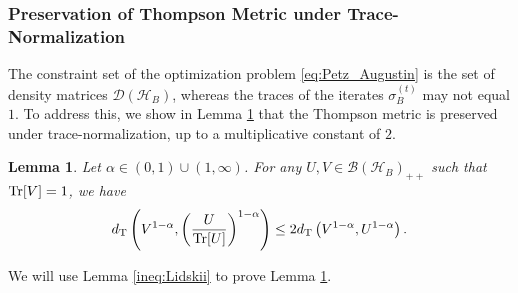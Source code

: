\documentclass{article}
\newtheorem{lemma}[theorem]{Lemma}
\begin{document}
\subsubsection{Preservation of Thompson Metric under Trace-Normalization}
\label{subsec:NormalStable}
The constraint set of the optimization problem \eqref{eq:Petz_Augustin} is the set of density matrices $\mathcal{D}\left(\mathcal{H}_B\right)$, whereas the traces of the iterates $\sigma_B^{(t)}$ may not equal $1$.
To address this, we show in Lemma \ref{ineq:SmallNormalThompson} that the Thompson metric is 
preserved
under 
trace-normalization, up to a multiplicative constant of $2$. 

\begin{lemma}
    \label{ineq:SmallNormalThompson}
    Let $\alpha\in(0,1)\cup(1,\infty)$.
    For any $U,V\in\mathcal{B}\left( \mathcal{H}_B\right)_{++}$ such that $\Tr[V]=1$, we have
    \begin{align}
        d_{\mathrm{T}}\left(V^{1-\alpha},\left(\frac{U}{\Tr[U]}\right)^{1-\alpha}\right)
        \leq 2 d_{\mathrm{T}}\left(V^{1-\alpha},U^{1-\alpha}\right).
    \end{align}
\end{lemma}

We will use 
Lemma \ref{ineq:Lidskii} to prove Lemma \ref{ineq:SmallNormalThompson}. 
\end{document}
